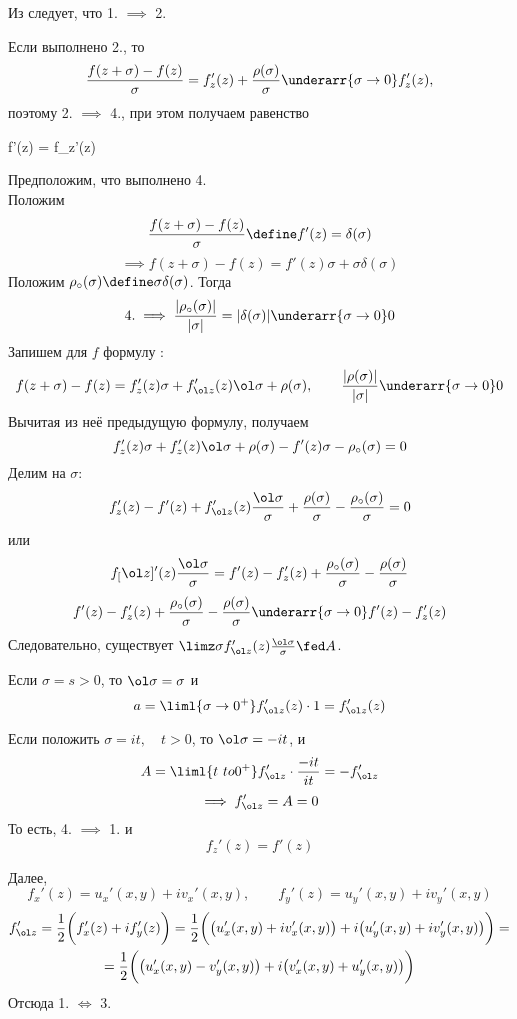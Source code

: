 \begin{iproof}
	\item Из  следует, что 1. $ \implies $ 2.
	\item Если выполнено 2., то
	$$ \frac{f(z + \sigma) - f(z)}\sigma = f_z'(z) + \frac{\rho(\sigma)}\sigma \underarr{\sigma \to 0} f_z'(z), $$
	поэтому 2. $ \implies $ 4., при этом получаем равенство
	\begin{equ}{20}
		f'(z) = f_z'(z)
	\end{equ}
	\item Предположим, что выполнено 4. \\
	Положим
	$$ \frac{f(z + \sigma) - f(z)}\sigma \define f'(z) = \delta(\sigma) $$
	$$ \implies f(z + \sigma) - f(z) = f'(z) \sigma + \sigma \delta(\sigma) $$
	Положим $ \rho_\circ(\sigma) \define \sigma\delta(\sigma) $. Тогда
	$$ 4. \implies \frac{|\rho_\circ(\sigma)|}{|\sigma|} = |\delta(\sigma)| \underarr{\sigma \to 0} 0 $$
	Запишем для $ f $ формулу :
	$$ f(z + \sigma) - f(z) = f_z'(z)\sigma + f_{\ol z}'(z) \ol \sigma + \rho(\sigma), \qquad \frac{|\rho(\sigma)|}{|\sigma|} \underarr{\sigma \to 0} 0 $$
	Вычитая из неё предыдущую формулу, получаем
	$$ f_z'(z) \sigma + f_z' (z) \ol \sigma + \rho(\sigma) - f'(z)\sigma - \rho_\circ(\sigma) = 0 $$
	Делим на $ \sigma $:
	$$ f_z'(z) - f'(z) + f_{\ol z}'(z) \frac{\ol \sigma}\sigma + \frac{\rho(\sigma)}\sigma - \frac{\rho_\circ(\sigma)}\sigma = 0 $$
	или
	$$ f_[\ol z]'(z) \frac{\ol \sigma}\sigma = f'(z) - f_z'(z) + \frac{\rho_\circ(\sigma)}\sigma - \frac{\rho(\sigma)}\sigma $$
	$$ f'(z) - f_z'(z) + \frac{\rho_\circ(\sigma)}\sigma - \frac{\rho(\sigma)}\sigma \underarr{\sigma \to 0} f'(z) - f_z'(z) $$
	Следовательно, существует $ \limz\sigma f_{\ol z}'(z) \frac{\ol \sigma}\sigma \fed A $.

	Если $ \sigma = s > 0 $, то $ \ol \sigma = \sigma $ и
	$$ a = \liml{\sigma \to 0^+} f_{\ol z}'(z) \cdot 1 = f_{\ol z}'(z) $$

	Если положить $ \sigma = it, \quad t > 0 $, то $ \ol \sigma = -it $, и
	$$ A = \liml{t\ to 0^+} f_{\ol z}' \cdot \frac{-it}{it} = -f_{\ol z}' $$
	$$ \implies f_{\ol z}' = A = 0 $$
	То есть, 4. $ \implies $ 1. и
	$$ f_z'(z) = f'(z) $$

	\item Далее,
	$$ f_x'(z) = u_x'(x, y) + iv_x'(x, y), \qquad f_y'(z) = u_y'(x, y) + iv_y'(x, y) $$
	\begin{multline*}
		f_{\ol z}' = \frac12 \bigg( f_x'(z) + if_y'(z) \bigg) = \frac12 \bigg( \big( u_x'(x, y) + iv_x'(x, y) \big) + i \big( u_y'(x, y) + iv_y'(x, y) \big) \bigg) = \\
		= \frac12 \bigg( \big( u_x'(x, y) - v_y'(x, y) \big) + i \big( v_x'(x, y) + u_y'(x, y) \big) \bigg)
	\end{multline*}
	Отсюда 1. $ \iff $ 3.
\end{iproof}

